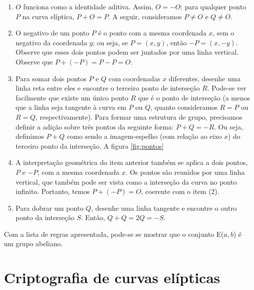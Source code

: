\begin{enumerate}
	\item $O$ funciona como a identidade aditiva. Assim, $O = -O$; para qualquer ponto $P$ na curva elíptica, $P + O = P$. A seguir, consideramos $P \neq O$ e $Q \neq O$.
	\item O negativo de um ponto \(P\) é o ponto com a mesma coordenada \(x\), sem o negativo da coordenada \(y\); ou seja, se $P=(x,y)$, então $-P=(x,-y)$. Observe que esses dois pontos podem ser juntados por uma linha vertical. Observe que $P+(-P)=P-P=O$.
	\item Para somar dois pontos \(P\) e \(Q\) com coordenadas \(x\) diferentes, desenhe uma linha reta entre eles e encontre o terceiro ponto de interseção \(R\). Pode-se ver facilmente que existe um único ponto \(R\) que é o ponto de interseção (a menos que a linha seja tangente à curva em \(P\) ou \(Q\), quanto consideramos $R=P$ ou $R=Q$, respectivamente). Para formar uma estrutura de grupo, precisamos definir a adição sobre três pontos da seguinte forma: $P+Q=-R$. Ou seja, definimos $P+Q$ como sendo a imagem-espelho (com relação ao eixo \(x\)) do terceiro ponto da interseção. A figura \ref{fig:pontos}
	\item A interpretação geométrica do item anterior também se aplica a dois pontos, \(P\) e \(-P\), com a mesma coordenada \(x\). Os pontos são reunidos por uma linha vertical, que também pode ser vista como a interseção da curva no ponto infinito. Portanto, temos $P+(-P)=O$, coerente com o item (2).
	\item Para dobrar um ponto \(Q\), desenhe uma linha tangente e encontre o outro ponto da interseção \(S\). Então, $Q+Q=2Q=-S$.
\end{enumerate}

Com a lista de regras apresentada, pode-se se mostrar que o conjunto E(\(a, b\)) é um grupo abeliano. \cite{Stallings:2011}

%
%
\section{Criptografia de curvas elípticas}

